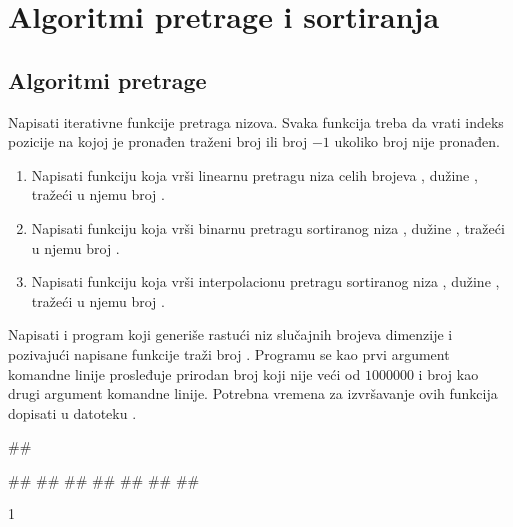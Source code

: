 
\chapter{Algoritmi pretrage i sortiranja}

\section{Algoritmi pretrage}

\begin{Exercise}[label=401]
  Napisati iterativne funkcije pretraga nizova. Svaka funkcija treba
  da vrati indeks pozicije na kojoj je pronađen traženi broj ili
  broj $-1$ ukoliko broj nije pronađen.
  \begin{enumerate}  
  \item Napisati funkciju  koja vrši linearnu pretragu niza 
    celih brojeva , dužine , tražeći u njemu broj
    .  
  \item Napisati funkciju  koja vrši binarnu pretragu
    sortiranog niza , dužine , tražeći u njemu broj .
  \item Napisati funkciju  koja vrši interpolacionu pretragu
    sortiranog niza , dužine , tražeći u njemu broj .
  \end{enumerate}
  Napisati i program koji generiše rastući niz slučajnih brojeva dimenzije
   i pozivajući napisane funkcije traži broj . Programu se kao prvi 
  argument komandne linije prosleđuje prirodan broj  koji nije veći od $1000000$ i broj  kao drugi
  argument komandne linije. Potrebna vremena za izvršavanje ovih
  funkcija dopisati u datoteku .

  
\begin{minitest}
\begin{test}{1}
##
  
#\naslovIzlaz#
##
##
##
##
##
##
\end{test}
\end{minitest}
\begin{minitest}
\begin{test2}{1}
    


\end{test2}
\end{minitest}
\end{Exercise}

